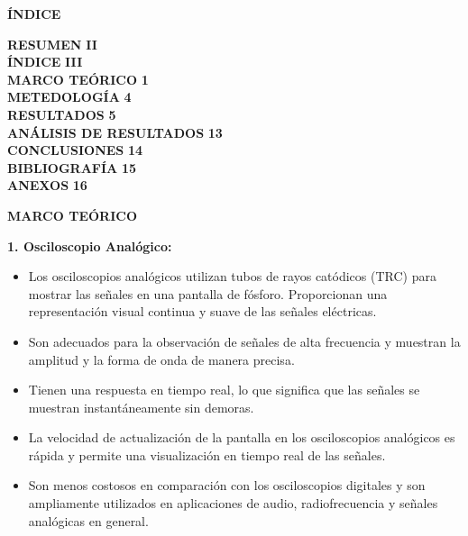 \documentclass[12pt]{article}
\begin{document}
	\newpage
	
	\begin{center}
		\textbf{\large ÍNDICE}\\
	\end{center}
	
	\noindent \textbf{RESUMEN} \hfill \textbf{II}\\
	\noindent \textbf{ÍNDICE} \hfill \textbf{III}\\
	\noindent \textbf{MARCO TEÓRICO} \hfill \textbf{1}\\
	\noindent \textbf{METEDOLOGÍA} \hfill \textbf{4}\\
	\noindent \textbf{RESULTADOS} \hfill \textbf{5}\\
	\noindent \textbf{ANÁLISIS DE RESULTADOS} \hfill \textbf{13}\\
	\noindent \textbf{CONCLUSIONES} \hfill \textbf{14}\\
	\noindent \textbf{BIBLIOGRAFÍA} \hfill \textbf{15}\\
	\noindent \textbf{ANEXOS} \hfill \textbf{16}\\
	
	\newpage
	
	
	\begin{center}
		\textbf{\large MARCO TEÓRICO}\\
	\end{center}
	
	\textbf{1. Osciloscopio Analógico:}

        \begin{itemize}
            \item Los osciloscopios analógicos utilizan tubos de rayos catódicos (TRC) para mostrar las señales en una pantalla de fósforo. Proporcionan una representación visual continua y suave de las señales eléctricas.
            \item Son adecuados para la observación de señales de alta frecuencia y muestran la amplitud y la forma de onda de manera precisa.
            \item Tienen una respuesta en tiempo real, lo que significa que las señales se muestran instantáneamente sin demoras.
            \item La velocidad de actualización de la pantalla en los osciloscopios analógicos es rápida y permite una visualización en tiempo real de las señales.
            \item Son menos costosos en comparación con los osciloscopios digitales y son ampliamente utilizados en aplicaciones de audio, radiofrecuencia y señales analógicas en general.
        \end{itemize}
        
\end{document}
